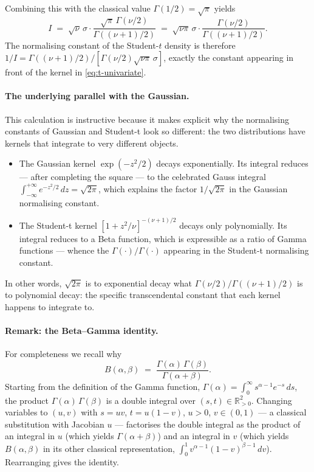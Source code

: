 \documentclass[11pt, a4paper, oneside]{article}
\begin{document}
Combining this with the classical value $\Gamma(1/2) = \sqrt{\pi}$ yields
\[
I \;=\; \sqrt{\nu}\,\sigma \cdot \frac{\sqrt{\pi}\,\Gamma(\nu/2)}{\Gamma((\nu+1)/2)}
\;=\; \sqrt{\nu\pi}\,\sigma \cdot \frac{\Gamma(\nu/2)}{\Gamma((\nu+1)/2)}.
\]
The normalising constant of the Student-$t$ density is therefore
$1/I = \Gamma((\nu+1)/2) / [\Gamma(\nu/2)\sqrt{\nu\pi}\,\sigma]$,
exactly the constant appearing in front of the kernel in
\eqref{eq:t-univariate}.

\paragraph{The underlying parallel with the Gaussian.}
This calculation is instructive because it makes explicit why the
normalising constants of Gaussian and Student-t look so different: the
two distributions have kernels that integrate to very different objects.
\begin{itemize}[leftmargin=1.5em, itemsep=3pt]
    \item The Gaussian kernel $\exp(-z^2/2)$ decays exponentially. Its
          integral reduces — after completing the square — to the
          celebrated Gauss integral
          $\int_{-\infty}^{+\infty} e^{-z^2/2}\,dz = \sqrt{2\pi}$,
          which explains the factor $1/\sqrt{2\pi}$ in the Gaussian
          normalising constant.
    \item The Student-t kernel $[1 + z^2/\nu]^{-(\nu+1)/2}$ decays only
          polynomially. Its integral reduces to a Beta function, which
          is expressible as a ratio of Gamma functions — whence the
          $\Gamma(\cdot)/\Gamma(\cdot)$ appearing in the Student-t
          normalising constant.
\end{itemize}
In other words, $\sqrt{2\pi}$ is to exponential decay what
$\Gamma(\nu/2)/\Gamma((\nu+1)/2)$ is to polynomial decay: the specific
transcendental constant that each kernel happens to integrate to.

\paragraph{Remark: the Beta–Gamma identity.}
For completeness we recall why
\[
B(\alpha,\beta) \;=\; \frac{\Gamma(\alpha)\,\Gamma(\beta)}{\Gamma(\alpha + \beta)}.
\]
Starting from the definition of the Gamma function,
$\Gamma(\alpha) = \int_0^\infty s^{\alpha - 1} e^{-s}\, ds$, the product
$\Gamma(\alpha)\,\Gamma(\beta)$ is a double integral over
$(s, t) \in \mathbb{R}_{>0}^{2}$. Changing variables to $(u, v)$ with
$s = uv$, $t = u(1-v)$, $u > 0$, $v \in (0, 1)$ — a classical substitution
with Jacobian $u$ — factorises the double integral as the product of an
integral in $u$ (which yields $\Gamma(\alpha + \beta)$) and an integral
in $v$ (which yields $B(\alpha, \beta)$ in its other classical
representation, $\int_0^1 v^{\alpha-1}(1-v)^{\beta-1}\,dv$). Rearranging
gives the identity.
\end{document}
